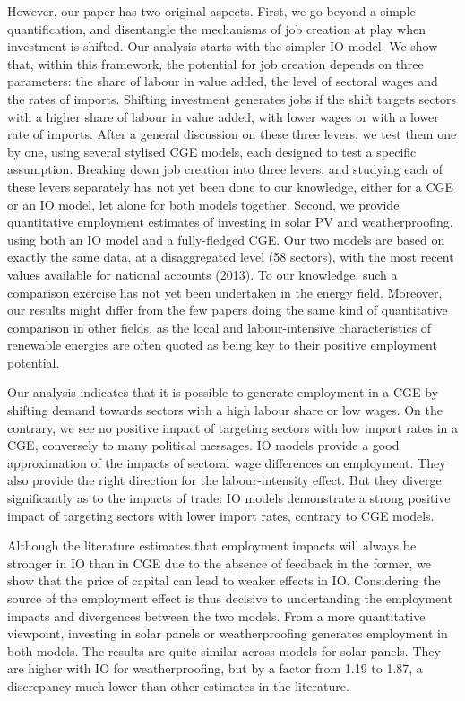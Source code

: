 However, our paper has two original aspects. 
First, we go beyond a simple quantification, and disentangle the mechanisms of job creation at play when investment is shifted. 
Our analysis starts with the simpler IO model. We show that, within this framework, the potential for job creation depends on three parameters: the share of labour in value added, the level of sectoral wages and the rates of imports. Shifting investment generates jobs if the shift targets sectors with a higher share of labour in value added, with lower wages or with a lower rate of imports. After a general discussion on these three levers, we test them one by one, using several stylised CGE models, each designed to test a specific assumption.
Breaking down job creation into three levers, and studying each of these levers separately has not yet been done to our knowledge, either for a CGE or an IO model, let alone for both models together.
Second, we provide quantitative employment estimates of investing in solar PV and weatherproofing, using both an IO model and a fully-fledged CGE. Our two models are based on exactly the same data, at a disaggregated level (58 sectors), with the most recent values available for national accounts (2013). To our knowledge, such a comparison exercise has not yet been undertaken in the energy field. Moreover, our results might differ from the few papers doing the same kind of quantitative comparison in other fields, as the local and labour-intensive characteristics of renewable energies are often quoted as being key to their positive employment potential.

Our analysis indicates that it is possible to generate employment in a CGE by shifting demand towards sectors with a high labour share or low wages. On the contrary, we see no positive impact of targeting sectors with low import rates in a CGE, conversely to many political messages.
IO models provide a good approximation of the impacts of sectoral wage differences on employment. They also provide the right direction for the labour-intensity effect. But they diverge significantly as to the impacts of trade: IO models demonstrate a strong positive impact of targeting sectors with lower import rates, contrary to CGE models.

Although the literature estimates that employment impacts will always be stronger in IO than in CGE due to the absence of feedback in the former, we show that the price of capital can lead to weaker effects in IO. Considering the source of the employment effect is thus decisive to undertanding the employment impacts and divergences between the two models.
From a more quantitative viewpoint, investing in solar panels or weatherproofing generates employment in both models. The results are quite similar across models for solar panels. They are higher with IO for weatherproofing, but by a factor from 1.19 to 1.87, a discrepancy much lower than other estimates in the literature. 

